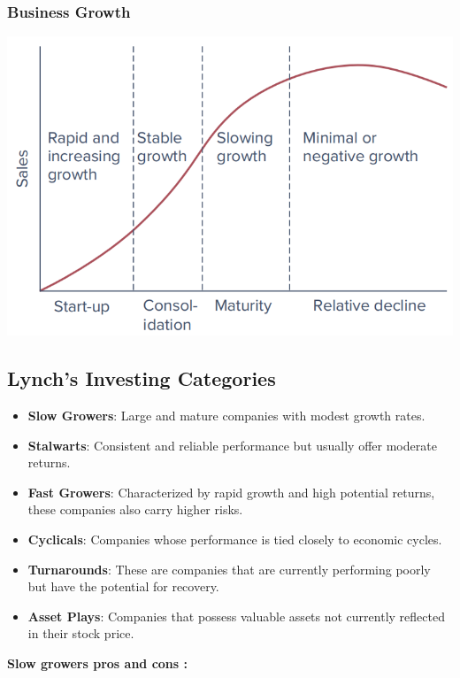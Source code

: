 \documentclass[
]{book}
\providecommand{\tightlist}{%
  \setlength{\itemsep}{0pt}\setlength{\parskip}{0pt}}
\begin{document}
\hypertarget{business-growth}{%
\subsubsection{Business Growth}\label{business-growth}}

\includegraphics{Resources/businesscycle.png}

\hypertarget{lynchs-investing-categories}{%
\subsection{Lynch's Investing
Categories}\label{lynchs-investing-categories}}

\begin{itemize}
\tightlist
\item
  \textbf{Slow Growers}: Large and mature companies with modest growth
  rates.
\item
  \textbf{Stalwarts}: Consistent and reliable performance but usually
  offer moderate returns.
\item
  \textbf{Fast Growers}: Characterized by rapid growth and high
  potential returns, these companies also carry higher risks.
\item
  \textbf{Cyclicals}: Companies whose performance is tied closely to
  economic cycles.
\item
  \textbf{Turnarounds}: These are companies that are currently
  performing poorly but have the potential for recovery.
\item
  \textbf{Asset Plays}: Companies that possess valuable assets not
  currently reflected in their stock price.
\end{itemize}

\textbf{Slow growers pros and cons :}
\end{document}
